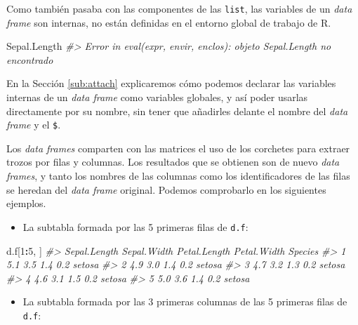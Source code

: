 \documentclass[
]{book}
\newenvironment{Shaded}{\begin{snugshade}}{\end{snugshade}}
\newcommand{\CommentTok}[1]{\textcolor[rgb]{0.56,0.35,0.01}{\textit{#1}}}
\newcommand{\DecValTok}[1]{\textcolor[rgb]{0.00,0.00,0.81}{#1}}
\newcommand{\NormalTok}[1]{#1}
\newcommand{\OperatorTok}[1]{\textcolor[rgb]{0.81,0.36,0.00}{\textbf{#1}}}
\providecommand{\tightlist}{%
  \setlength{\itemsep}{0pt}\setlength{\parskip}{0pt}}
\theoremstyle{definition}
\theoremstyle{definition}
\theoremstyle{definition}
\theoremstyle{remark}
\begin{document}
Como también pasaba con las componentes de las \texttt{list}, las variables de un \emph{data frame} son internas, no están definidas en el entorno global de trabajo de R.

\begin{Shaded}
\begin{Highlighting}[]
\NormalTok{Sepal.Length }
\CommentTok{\#\textgreater{} Error in eval(expr, envir, enclos): objeto \textquotesingle{}Sepal.Length\textquotesingle{} no encontrado}
\end{Highlighting}
\end{Shaded}

En la Sección \ref{sub:attach} explicaremos cómo podemos declarar las variables internas de un \emph{data frame} como variables globales, y así poder usarlas directamente por su nombre, sin tener que añadirles delante el nombre del \emph{data frame} y el \texttt{\$}.

Los \emph{data frames} comparten con las matrices el uso de los corchetes para extraer trozos por filas y columnas. Los resultados que se obtienen son de nuevo \emph{data frames}, y tanto los nombres de las columnas como los identificadores de las filas se heredan del \emph{data frame} original. Podemos comprobarlo en los siguientes ejemplos.

\begin{itemize}
\tightlist
\item
  La subtabla formada por las 5 primeras filas de \texttt{d.f}:
\end{itemize}

\begin{Shaded}
\begin{Highlighting}[]
\NormalTok{d.f[}\DecValTok{1}\OperatorTok{:}\DecValTok{5}\NormalTok{, ]}
\CommentTok{\#\textgreater{}   Sepal.Length Sepal.Width Petal.Length Petal.Width Species}
\CommentTok{\#\textgreater{} 1          5.1         3.5          1.4         0.2  setosa}
\CommentTok{\#\textgreater{} 2          4.9         3.0          1.4         0.2  setosa}
\CommentTok{\#\textgreater{} 3          4.7         3.2          1.3         0.2  setosa}
\CommentTok{\#\textgreater{} 4          4.6         3.1          1.5         0.2  setosa}
\CommentTok{\#\textgreater{} 5          5.0         3.6          1.4         0.2  setosa}
\end{Highlighting}
\end{Shaded}

\begin{itemize}
\tightlist
\item
  La subtabla formada por las 3 primeras columnas de las 5 primeras filas de \texttt{d.f}:
\end{itemize}
\end{document}

